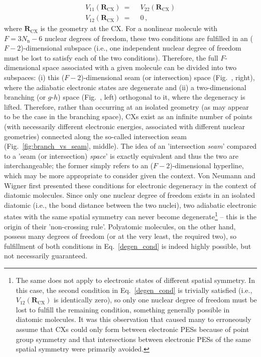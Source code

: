 \documentclass[9pt,bestpractices,pubversion]{livecoms}
\newcommand{\R}{\mathbf{R}}
\begin{document}
\begin{equation}
\label{degen_cond}
\begin{split}
    V_{11}(\R_{\text{CX}}) \: =& \:\: V_{22}(\R_{\text{CX}})\\
    V_{12}(\R_{\text{CX}}) \: =& \:\: 0 \, ,
\end{split}
\end{equation}
where $\R_\text{CX}$ is the geometry at the CX. For a nonlinear molecule with $F = 3N_\text{n} - 6$ nuclear degrees of freedom, these two conditions are fulfilled in an ($F - 2$)-dimensional subspace (i.e., one independent nuclear degree of freedom must be lost to satisfy each of the two conditions).\cite{malhado2014non}
Therefore, the full $F$-dimensional space associated with a given molecule can be divided into two subspaces: (i) this ($F - 2$)-dimensional seam (or intersection) space\cite{atchity_potential_1991} (Fig.~, right), where the adiabatic electronic states are degenerate and (ii) a two-dimensional branching\cite{atchity_potential_1991} (or $g$-$h$)\cite{yarkony_conical_2001} space (Fig.~, left) orthogonal to it, where the degeneracy is lifted.
Therefore, rather than occurring at an isolated geometry (as may appear to be the case in the branching space), CXs exist as an infinite number of points (with necessarily different electronic energies, associated with different nuclear geometries) connected\cite{B407959K, coe2008extent, morreale2024topology, barbatti2004photochemistry} along the so-called intersection seam (Fig.~\ref{fig:branch_vs_seam}, middle).
The idea of an 'intersection \textit{seam}' compared to a 'seam (or intersection) \textit{space}' is exactly equivalent and thus the two are interchangeable; the former simply refers to an ($F - 2$)-dimensional hyperline, which may be more appropriate to consider given the context.
Von Neumann and Wigner first presented these conditions for electronic degeneracy in the context of diatomic molecules.
Since only one nuclear degree of freedom exists in an isolated diatomic (i.e., the bond distance between the two nuclei), two adiabatic electronic states with the same spatial symmetry can never become degenerate\footnote{
The same does not apply to electronic states of different spatial symmetry. 
In this case, the second condition in Eq.~\eqref{degen_cond} is trivially satisfied (i.e., $V_{12}(\R_{\text{CX}})$ is identically zero), so only one nuclear degree of freedom must be lost to fulfill the remaining condition, something generally possible in diatomic molecules. 
It was this observation that caused many to erroneously assume that CXs could only form between electronic PESs because of point group symmetry and that intersections between electronic PESs of the same spatial symmetry were primarily avoided.\cite{domcke_conical_2004}
} 
-- this is the origin of their 'non-crossing rule'.\cite{vonneumann1929eigenvalues}
Polyatomic molecules, on the other hand, possess many degrees of freedom (or at the very least, the required two), so fulfillment of both conditions in Eq.~\eqref{degen_cond} is indeed highly possible, but not necessarily guaranteed.\cite{yarkony_conical_1998}
\end{document}
